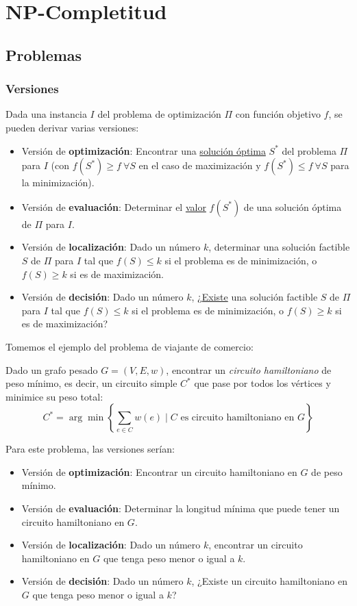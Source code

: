 \chapter{NP-Completitud}
\label{capitulo-np-completitud}

\section{Problemas}

\subsection{Versiones}

Dada una instancia $I$ del problema de optimización $\Pi$ con función objetivo $f$, se pueden derivar varias versiones:
\begin{itemize}
    \item Versión de \textbf{optimización}: Encontrar una \underline{solución óptima} $S^*$ del problema $\Pi$ para $I$ (con $f(S^*) \geq f\ \forall S$ en el caso de maximización y $f(S^*) \le f\ \forall S$ para la minimización).
    \item Versión de \textbf{evaluación}: Determinar el \underline{valor} $f(S^*)$ de una solución óptima de $\Pi$ para $I$.
    \item Versión de \textbf{localización}: Dado un número $k$, determinar una solución factible $S$ de $\Pi$ para $I$ tal que \underline{$f(S) \leq k$} si el problema es de minimización, o $f(S) \geq k$ si es de maximización.
    \item Versión de \textbf{decisión}: Dado un número $k$, ¿\underline{Existe} una solución factible $S$ de $\Pi$ para $I$ tal que $f(S) \leq k$ si el problema es de minimización, o $f(S) \geq k$ si es de maximización?
\end{itemize}

Tomemos el ejemplo del problema de viajante de comercio:

\begin{problema}
    Dado un grafo pesado $G = (V, E, w)$, encontrar un \textit{circuito hamiltoniano} de peso mínimo, es decir, un circuito simple $C^*$ que pase por todos los vértices y minimice su peso total:
    $$C^* = \arg\min\left\{\sum_{e \in C} w(e) \mid C \text{ es circuito hamiltoniano en $G$}\right\}$$
\end{problema}

Para este problema, las versiones serían:
\begin{itemize}
    \item Versión de \textbf{optimización}: Encontrar un circuito hamiltoniano en $G$ de peso mínimo.
    \item Versión de \textbf{evaluación}: Determinar la longitud mínima que puede tener un circuito hamiltoniano en $G$.
    \item Versión de \textbf{localización}: Dado un número $k$, encontrar un circuito hamiltoniano en $G$ que tenga peso menor o igual a $k$.
    \item Versión de \textbf{decisión}: Dado un número $k$, ¿Existe un circuito hamiltoniano en $G$ que tenga peso menor o igual a $k$?
\end{itemize}


